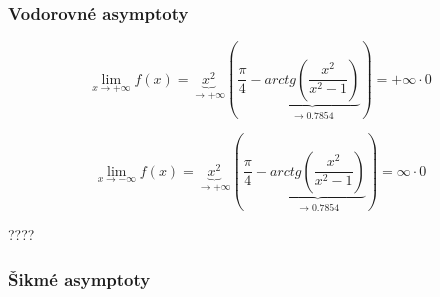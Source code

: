 \subsubsection{Vodorovné asymptoty}
\begin{displaymath}
\lim_{x \to + \infty} f(x) =\underbrace{x^2}_{\rightarrow+\infty}(\frac{\pi}{4}-\underbrace{arctg(\frac{x^2}{x^2-1})}_{\rightarrow 0.7854}) = + \infty \cdot 0
\end{displaymath}

\begin{displaymath}
\lim_{x \to - \infty} f(x) =\underbrace{x^2}_{\rightarrow+\infty}(\frac{\pi}{4}-\underbrace{arctg(\frac{x^2}{x^2-1})}_{\rightarrow 0.7854}) = \infty \cdot 0
\end{displaymath}

????

\subsubsection{Šikmé asymptoty}

